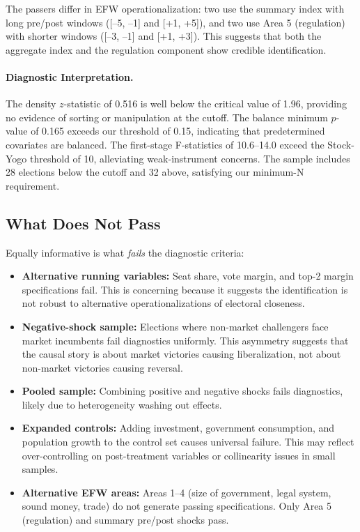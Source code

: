 \documentclass[12pt,a4paper]{article}
\begin{document}
The passers differ in EFW operationalization: two use the summary index 
with long pre/post windows ([--5, --1] and [+1, +5]), and two use Area 5 
(regulation) with shorter windows ([--3, --1] and [+1, +3]). This 
suggests that both the aggregate index and the regulation component 
show credible identification.

\paragraph{Diagnostic Interpretation.}
The density $z$-statistic of 0.516 is well below the critical value 
of 1.96, providing no evidence of sorting or manipulation at the 
cutoff. The balance minimum $p$-value of 0.165 exceeds our threshold 
of 0.15, indicating that predetermined covariates are balanced. The 
first-stage F-statistics of 10.6--14.0 exceed the Stock-Yogo threshold 
of 10, alleviating weak-instrument concerns. The sample includes 28 
elections below the cutoff and 32 above, satisfying our minimum-N 
requirement.

\subsection{What Does Not Pass}

Equally informative is what \textit{fails} the diagnostic criteria:
\begin{itemize}[noitemsep]
    \item \textbf{Alternative running variables:} Seat share, vote margin, 
    and top-2 margin specifications fail. This is concerning because it 
    suggests the identification is not robust to alternative 
    operationalizations of electoral closeness.
    
    \item \textbf{Negative-shock sample:} Elections where non-market 
    challengers face market incumbents fail diagnostics uniformly. This 
    asymmetry suggests that the causal story is about market victories 
    causing liberalization, not about non-market victories causing reversal.
    
    \item \textbf{Pooled sample:} Combining positive and negative shocks 
    fails diagnostics, likely due to heterogeneity washing out effects.
    
    \item \textbf{Expanded controls:} Adding investment, government 
    consumption, and population growth to the control set causes 
    universal failure. This may reflect over-controlling on post-treatment 
    variables or collinearity issues in small samples.
    
    \item \textbf{Alternative EFW areas:} Areas 1--4 (size of government, 
    legal system, sound money, trade) do not generate passing specifications. 
    Only Area 5 (regulation) and summary pre/post shocks pass.
\end{itemize}
\end{document}
